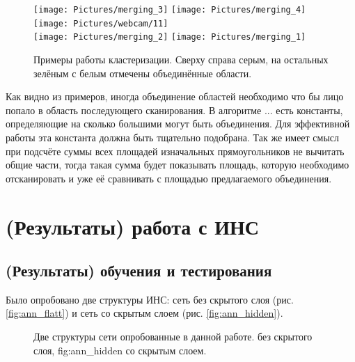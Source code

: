 \documentclass[12pt]{report}
\begin{document}
\begin{figure}[h]
	\centering	
	\texttt{[image: Pictures/merging\_3]}\hspace{0.2cm}
	\texttt{[image: Pictures/merging\_4]}\hspace{0.2cm}
	\texttt{[image: Pictures/webcam/11]}\hspace{0.2cm}
	\\[0.5cm]
	\texttt{[image: Pictures/merging\_2]}\hspace{0.2cm}
	\texttt{[image: Pictures/merging\_1]}\hspace{0.2cm}
	
	\caption{Примеры работы кластеризации. Сверху справа серым, на остальных зелёным с белым отмечены объединённые 
области.}
	\label{fig:merging_examples}
\end{figure}

Как видно из примеров, иногда объединение областей необходимо что бы лицо попало в область последующего 
сканирования.   
В алгоритме ... есть константы, определяющие на сколько большими могут быть объединения. Для эффективной работы эта 
константа должна быть тщательно подобрана. Так же имеет смысл при подсчёте суммы всех площадей изначальных 
прямоугольников не вычитать общие части, тогда такая сумма будет показывать площадь, которую необходимо 
отсканировать  
и уже её сравнивать с площадью предлагаемого объединения.

\section{(Результаты) работа с ИНС}

\subsection{(Результаты) обучения и тестирования}

Было опробовано две структуры ИНС: сеть без скрытого слоя (рис. \ref{fig:ann_flatt}) и сеть со скрытым слоем (рис. 
\ref{fig:ann_hidden}).

\begin{figure}[h]
	\centering
	\caption{Две структуры сети опробованные в данной работе.  без скрытого слоя, \subref
{fig:ann_hidden} со скрытым слоем.}
	\label{fig:ann_structure}
\end{figure}
\end{document}
